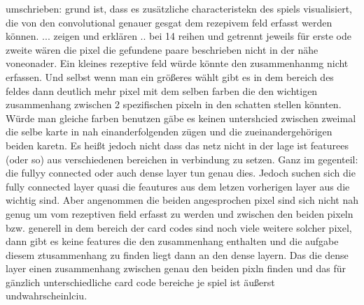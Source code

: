 umschrieben: grund ist, dass es zusätzliche characteristekn des spiels visualisiert, die von den convolutional genauer gesgat dem rezepivem feld erfasst werden können. ... zeigen und erklären .. bei 14 reihen und getrennt jeweils für erste ode zweite wären die pixel die gefundene paare beschrieben nicht in der nähe voneonader. Ein kleines rezeptive feld würde könnte den zusammenhanmg nicht erfassen. Und selbst wenn man ein größeres wählt gibt es in dem bereich des feldes dann deutlich mehr pixel mit dem selben farben die den wichtigen zusammenhang zwischen 2 spezifischen pixeln in den schatten stellen könnten. Würde man gleiche farben benutzen gäbe es keinen untershcied zwischen zweimal die selbe karte in nah einanderfolgenden zügen und die zueinandergehörigen beiden karetn. Es heißt jedoch nicht dass das netz nicht in der lage ist featurees (oder so) aus verschiedenen bereichen in verbindung zu setzen. Ganz im gegenteil: die fullyy connected oder auch dense layer tun genau dies. Jedoch suchen sich die fully connected layer quasi die feautures aus dem letzen vorherigen layer aus die wichtig sind. Aber angenommen die beiden angesprochen pixel sind sich nicht nah genug um vom rezeptiven field erfasst zu werden und zwischen den beiden pixeln bzw. generell in dem bereich der card codes sind noch viele weitere solcher pixel, dann gibt es keine features die den zusammenhang enthalten und die aufgabe diesem ztusammenhang zu finden liegt dann an den dense layern. Das die dense layer einen zusammenhang zwischen genau den beiden pixln finden und das für gänzlich unterschiedliche card code bereiche je spiel ist äußerst undwahrscheinlciu. 


